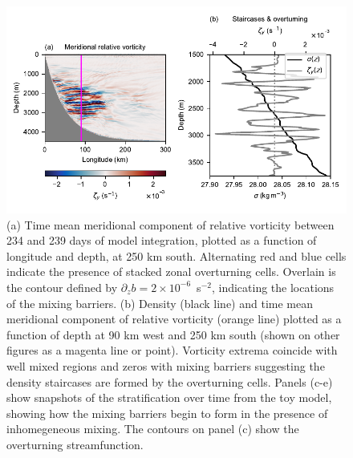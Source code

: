 \begin{figure}
    \centering
    \includegraphics{../figures/Figure3.pdf}
    \caption{(a) Time mean meridional component of relative vorticity between 234 and 239 days of model integration, plotted as a function of longitude and depth, at 250 km south. Alternating red and blue cells indicate the presence of stacked zonal overturning cells. Overlain is the contour defined by $\partial_z b = 2 \times 10^{-6}$~s$^{-2}$, indicating the locations of the mixing barriers. (b) Density (black line) and time mean meridional component of relative vorticity (orange line) plotted as a function of depth at 90 km west and 250 km south (shown on other figures as a magenta line or point). Vorticity extrema coincide with well mixed regions and zeros with mixing barriers suggesting the density staircases are formed by the overturning cells. Panels (c-e) show snapshots of the stratification over time from the toy model, showing how the mixing barriers begin to form in the presence of inhomegeneous mixing. The contours on panel (c) show the overturning streamfunction.}
    \label{fig:StaircaseMechanism}
\end{figure}

